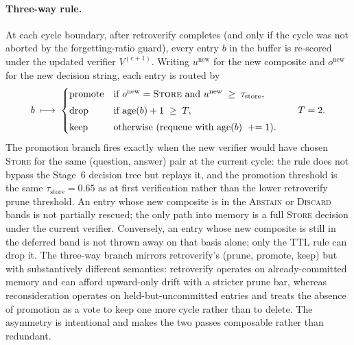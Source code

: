 \paragraph{Three-way rule.}
At each cycle boundary, after retroverify completes (and only if the cycle was not aborted by the forgetting-ratio guard), every entry $b$ in the buffer is re-scored under the updated verifier $V^{(c+1)}$. Writing $u^{\text{new}}$ for the new composite and $o^{\text{new}}$ for the new decision string, each entry is routed by
\begin{equation}
b \;\longmapsto\;
\begin{cases}
\text{promote} & \text{if } o^{\text{new}} = \textsc{Store} \text{ and } u^{\text{new}} \;\geq\; \tau_{\text{store}}, \\[3pt]
\text{drop}    & \text{if } \mathrm{age}(b) + 1 \;\geq\; T, \\[3pt]
\text{keep}    & \text{otherwise (requeue with } \mathrm{age}(b) \;\mathrel{+}= 1\text{)}.
\end{cases}
\qquad T = 2.
\label{eq:defer-branch}
\end{equation}
The promotion branch fires exactly when the new verifier would have chosen \textsc{Store} for the same (question, answer) pair at the current cycle: the rule does not bypass the Stage~6 decision tree but replays it, and the promotion threshold is the same $\tau_{\text{store}} = 0.65$ as at first verification rather than the lower retroverify prune threshold. An entry whose new composite is in the \textsc{Abstain} or \textsc{Discard} bands is not partially rescued; the only path into memory is a full \textsc{Store} decision under the current verifier. Conversely, an entry whose new composite is still in the deferred band is not thrown away on that basis alone; only the TTL rule can drop it. The three-way branch mirrors retroverify's (prune, promote, keep) but with substantively different semantics: retroverify operates on already-committed memory and can afford upward-only drift with a stricter prune bar, whereas reconsideration operates on held-but-uncommitted entries and treats the absence of promotion as a vote to keep one more cycle rather than to delete. The asymmetry is intentional and makes the two passes composable rather than redundant.

